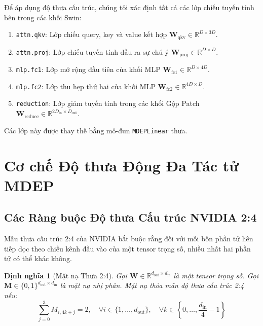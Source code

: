 \documentclass[11pt]{article}
\newtheorem{definition}{Định nghĩa}
\newcommand{\R}{\mathbb{R}}
\begin{document}
Để áp dụng độ thưa cấu trúc, chúng tôi xác định tất cả các lớp chiếu tuyến tính bên trong các khối Swin:
\begin{enumerate}
    \item \texttt{attn.qkv}: Lớp chiếu query, key và value kết hợp $\bm{W}_{\text{qkv}} \in \R^{D \times 3D}$.
    \item \texttt{attn.proj}: Lớp chiếu tuyến tính đầu ra sự chú ý $\bm{W}_{\text{proj}} \in \R^{D \times D}$.
    \item \texttt{mlp.fc1}: Lớp mở rộng đầu tiên của khối MLP $\bm{W}_{\text{fc1}} \in \R^{D \times 4D}$.
    \item \texttt{mlp.fc2}: Lớp thu hẹp thứ hai của khối MLP $\bm{W}_{\text{fc2}} \in \R^{4D \times D}$.
    \item \texttt{reduction}: Lớp giảm tuyến tính trong các khối Gộp Patch $\bm{W}_{\text{reduce}} \in \R^{2D_{\text{in}} \times D_{\text{out}}}$.
\end{enumerate}
Các lớp này được thay thế bằng mô-đun \texttt{MDEPLinear} thưa.

\section{Cơ chế Độ thưa Động Đa Tác tử MDEP}\label{sec:mdep}

\subsection{Các Ràng buộc Độ thưa Cấu trúc NVIDIA 2:4}\label{subsec:24sparsity}

Mẫu thưa cấu trúc 2:4 của NVIDIA bắt buộc rằng đối với mỗi bốn phần tử liên tiếp dọc theo chiều kênh đầu vào của một tensor trọng số, nhiều nhất hai phần tử có thể khác không.

\begin{definition}[Mặt nạ Thưa 2:4]
Gọi $\bm{W} \in \R^{d_{\text{out}} \times d_{\text{in}}}$ là một tensor trọng số. Gọi $\bm{M} \in \{0, 1\}^{d_{\text{out}} \times d_{\text{in}}}$ là mặt nạ nhị phân. Mặt nạ thỏa mãn độ thưa cấu trúc 2:4 nếu:
\begin{equation}\label{eq:24_def}
    \sum_{j=0}^{3} M_{i, 4k+j} = 2, \quad \forall i \in \{1, \dots, d_{\text{out}}\}, \quad \forall k \in \left\{0, \dots, \frac{d_{\text{in}}}{4} - 1\right\}
\end{equation}
\end{definition}
\end{document}
